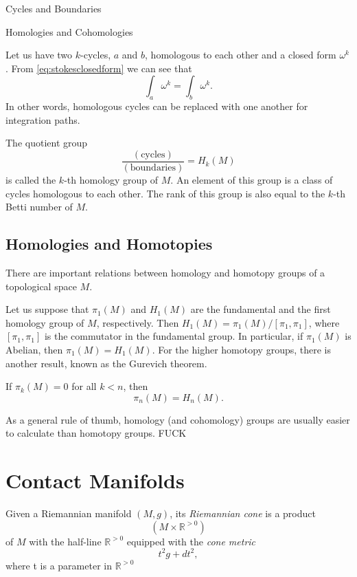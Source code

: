 \begin{subsubsection}{Cycles and Boundaries}
\begin{subsubsection}{Homologies and Cohomologies}
\begin{definition}
  Let us have two $k$-cycles, $a$ and $b$, homologous to each other and
  a closed form $\omega^k$. From \eqref{eq:stokesclosedform} we can see that 
  \begin{equation}
    \int_a{\omega^k} = \int_b{\omega^k}.
  \end{equation}
  In other words, homologous cycles can be replaced with one another for
  integration paths.
  \begin{definition}
    The quotient group
    \begin{equation}
      \frac{(\text{cycles})}{(\text{boundaries})} = H_k(M)
    \end{equation}
    is called the $k$-th homology group of $M$. An element of this group is
    a class of cycles homologous to each other. The rank of this group is also
    equal to the $k$-th Betti number of $M$.
\subsection{Homologies and Homotopies}
There are important relations between homology and homotopy groups of
a topological space $M$.
\par Let us suppose that $\pi_1(M)$ and $H_1(M)$ are the fundamental and the
first homology group of $M$, respectively. Then $H_1(M)
= \pi_1(M)/[\pi_1,\pi_1]$, where $[\pi_1,\pi_1]$ is the commutator in the
fundamental group. In particular, if $\pi_1(M)$ is Abelian, then $\pi_1(M)
= H_1(M)$. For the higher homotopy groups, there is another result, known as
the Gurevich theorem.
\begin{theorem}
  If $\pi_k(M) = 0$ for all $k<n$, then
  \begin{equation}
    \pi_n(M) = H_n(M).
  \end{equation}
\end{theorem}
As a general rule of thumb, homology (and cohomology) groups are usually easier
to calculate than homotopy groups. FUCK
    \section{Contact Manifolds}
\begin{definition}
Given a Riemannian manifold $(M,g)$, its \textit{Riemannian cone} is a product
\begin{equation}
(M\times\mathbb{R}^{>0})
\end{equation}
of $M$ with the half-line $\mathbb{R}^{>0}$ equipped with the \textit{cone metric}
\begin{equation}
t^2g+dt^2,
\end{equation}
where t is a parameter in $\mathbb{R}^{>0}$
\end{definition}


\end{definition}
\end{definition}
\end{subsubsection}
\end{subsubsection}
